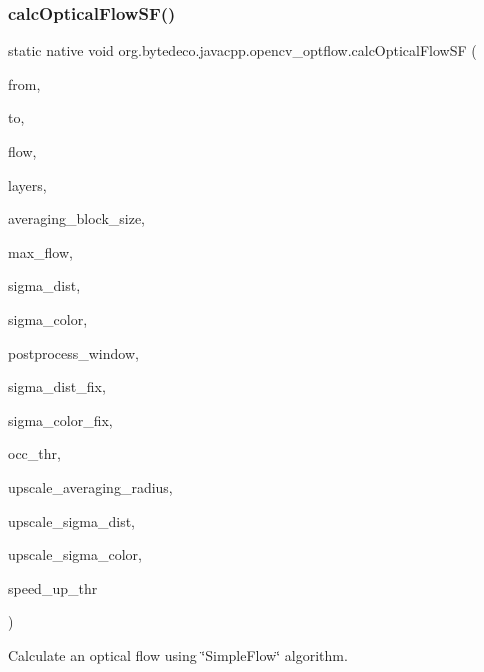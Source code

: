\subsubsection{\texorpdfstring{calc\+Optical\+Flow\+S\+F()}{calcOpticalFlowSF()}}
{\footnotesize\ttfamily static native void org.\+bytedeco.\+javacpp.\+opencv\+\_\+optflow.\+calc\+Optical\+Flow\+SF (\begin{DoxyParamCaption}\item[{@By\+Val Mat}]{from,  }\item[{@By\+Val Mat}]{to,  }\item[{@By\+Val Mat}]{flow,  }\item[{int}]{layers,  }\item[{int}]{averaging\+\_\+block\+\_\+size,  }\item[{int}]{max\+\_\+flow,  }\item[{double}]{sigma\+\_\+dist,  }\item[{double}]{sigma\+\_\+color,  }\item[{int}]{postprocess\+\_\+window,  }\item[{double}]{sigma\+\_\+dist\+\_\+fix,  }\item[{double}]{sigma\+\_\+color\+\_\+fix,  }\item[{double}]{occ\+\_\+thr,  }\item[{int}]{upscale\+\_\+averaging\+\_\+radius,  }\item[{double}]{upscale\+\_\+sigma\+\_\+dist,  }\item[{double}]{upscale\+\_\+sigma\+\_\+color,  }\item[{double}]{speed\+\_\+up\+\_\+thr }\end{DoxyParamCaption})\hspace{0.3cm}{\ttfamily [static]}}



Calculate an optical flow using \char`\"{}\+Simple\+Flow\char`\"{} algorithm. 


